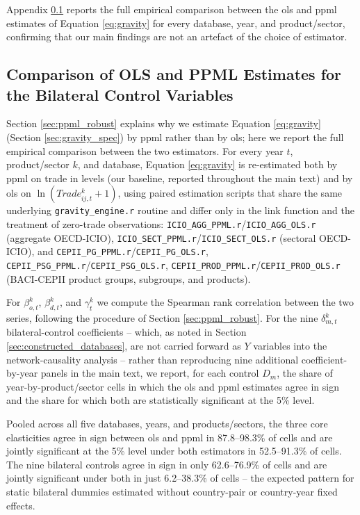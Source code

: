 \documentclass[preprint, 3p,
authoryear]{elsarticle} %
\begin{document}
Appendix \ref{app:ols_ppml_comparison} reports the full empirical
comparison between the \gls{ols} and \gls{ppml} estimates of Equation
\eqref{eq:gravity} for every database, year, and product/sector,
confirming that our main findings are not an artefact of the choice of
estimator.

\subsection{Comparison of OLS and PPML Estimates for the Bilateral
Control Variables}\label{app:ols_ppml_comparison}

Section \ref{sec:ppml_robust} explains why we estimate Equation
\eqref{eq:gravity} (Section \ref{sec:gravity_spec}) by \gls{ppml} rather
than by \gls{ols}; here we report the full empirical comparison between
the two estimators. For every year \(t\), product/sector \(k\), and
database, Equation \eqref{eq:gravity} is re-estimated both by \gls{ppml}
on trade in levels (our baseline, reported throughout the main text) and
by \gls{ols} on \(\ln(Trade_{ij,t}^{k}+1)\), using paired estimation
scripts that share the same underlying \texttt{gravity\_engine.r}
routine and differ only in the link function and the treatment of
zero-trade observations:
\texttt{ICIO\_AGG\_PPML.r}/\texttt{ICIO\_AGG\_OLS.r} (aggregate
OECD-ICIO), \texttt{ICIO\_SECT\_PPML.r}/\texttt{ICIO\_SECT\_OLS.r}
(sectoral OECD-ICIO), and
\texttt{CEPII\_PG\_PPML.r}/\texttt{CEPII\_PG\_OLS.r},
\texttt{CEPII\_PSG\_PPML.r}/\texttt{CEPII\_PSG\_OLS.r},
\texttt{CEPII\_PROD\_PPML.r}/\texttt{CEPII\_PROD\_OLS.r} (BACI-CEPII
product groups, subgroups, and products).

For \(\beta_{o,t}^{k}\), \(\beta_{d,t}^{k}\), and \(\gamma_t^{k}\) we
compute the Spearman rank correlation between the two series, following
the procedure of Section \ref{sec:ppml_robust}. For the nine
\(\delta_{m,t}^{k}\) bilateral-control coefficients -- which, as noted
in Section \ref{sec:constructed_databases}, are not carried forward as
\(Y\) variables into the network-causality analysis -- rather than
reproducing nine additional coefficient-by-year panels in the main text,
we report, for each control \(D_m\), the share of year-by-product/sector
cells in which the \gls{ols} and \gls{ppml} estimates agree in sign and
the share for which both are statistically significant at the 5\% level.

Pooled across all five databases, years, and products/sectors, the three
core elasticities agree in sign between \gls{ols} and \gls{ppml} in
87.8--98.3\% of cells and are jointly significant at the 5\% level under
both estimators in 52.5--91.3\% of cells. The nine bilateral controls
agree in sign in only 62.6--76.9\% of cells and are jointly significant
under both in just 6.2--38.3\% of cells -- the expected pattern for
static bilateral dummies estimated without country-pair or country-year
fixed effects.
\end{document}
